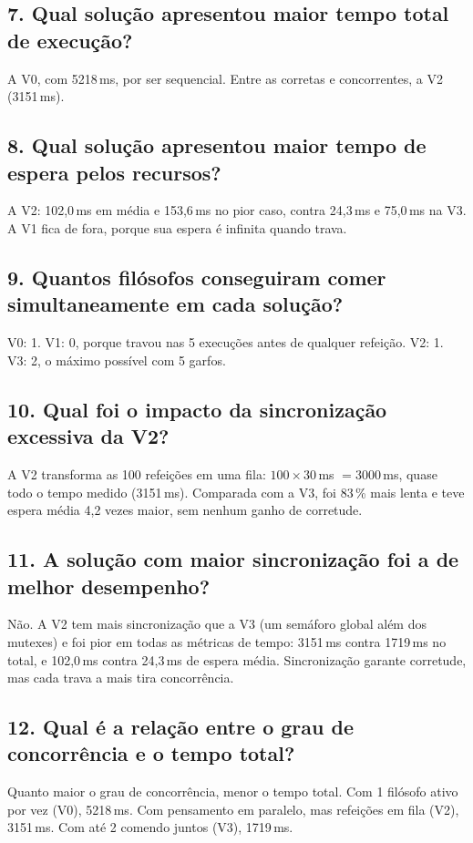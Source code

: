 \documentclass[11pt,a4paper]{article}
\begin{document}
\subsection*{7. Qual solução apresentou maior tempo total de execução?}
A V0, com 5218\,ms, por ser sequencial. Entre as corretas e concorrentes, a V2 (3151\,ms).

\subsection*{8. Qual solução apresentou maior tempo de espera pelos recursos?}
A V2: 102,0\,ms em média e 153,6\,ms no pior caso, contra 24,3\,ms e 75,0\,ms na V3. A V1 fica
de fora, porque sua espera é infinita quando trava.

\subsection*{9. Quantos filósofos conseguiram comer simultaneamente em cada solução?}
V0: 1. V1: 0, porque travou nas 5 execuções antes de qualquer refeição. V2: 1. V3: 2, o máximo possível
com 5 garfos.

\subsection*{10. Qual foi o impacto da sincronização excessiva da V2?}
A V2 transforma as 100 refeições em uma fila: $100 \times 30$\,ms $= 3000$\,ms, quase todo o
tempo medido (3151\,ms). Comparada com a V3, foi 83\,\% mais lenta e teve espera média 4,2 vezes
maior, sem nenhum ganho de corretude.

\subsection*{11. A solução com maior sincronização foi a de melhor desempenho?}
Não. A V2 tem mais sincronização que a V3 (um semáforo global além dos mutexes) e foi pior em
todas as métricas de tempo: 3151\,ms contra 1719\,ms no total, e 102,0\,ms contra 24,3\,ms de
espera média. Sincronização garante corretude, mas cada trava a mais tira concorrência.

\subsection*{12. Qual é a relação entre o grau de concorrência e o tempo total?}
Quanto maior o grau de concorrência, menor o tempo total. Com 1 filósofo ativo por vez (V0),
5218\,ms. Com pensamento em paralelo, mas refeições em fila (V2), 3151\,ms. Com até 2 comendo
juntos (V3), 1719\,ms.
\end{document}

